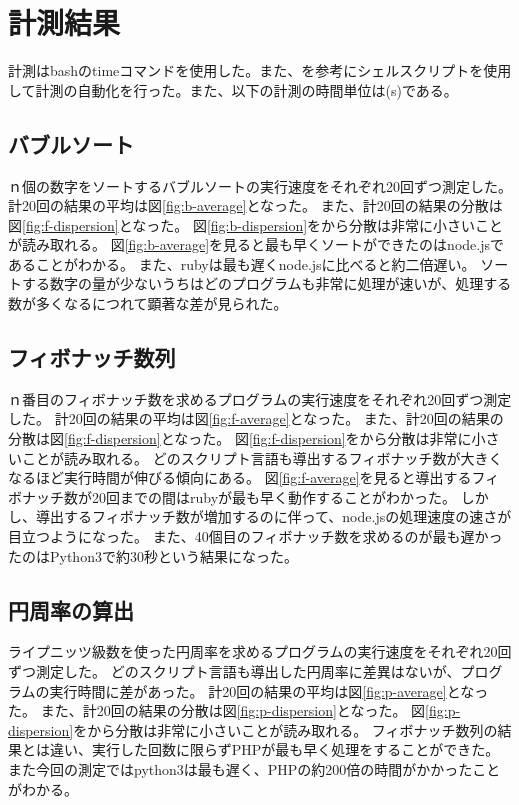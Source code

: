 \chapter{計測結果}
\label{cha:result}
計測はbashのtimeコマンドを使用した。また、\cite{bash}を参考にシェルスクリプトを使用して計測の自動化を行った。また、以下の計測の時間単位は(s)である。
\section{バブルソート}
ｎ個の数字をソートするバブルソートの実行速度をそれぞれ20回ずつ測定した。
計20回の結果の平均は図\ref{fig:b-average}となった。
また、計20回の結果の分散は図\ref{fig:f-dispersion}となった。
図\ref{fig:b-dispersion}をから分散は非常に小さいことが読み取れる。
図\ref{fig:b-average}を見ると最も早くソートができたのはnode.jsであることがわかる。
また、rubyは最も遅くnode.jsに比べると約二倍遅い。
ソートする数字の量が少ないうちはどのプログラムも非常に処理が速いが、処理する数が多くなるにつれて顕著な差が見られた。

\section{フィボナッチ数列}
ｎ番目のフィボナッチ数を求めるプログラムの実行速度をそれぞれ20回ずつ測定した。
計20回の結果の平均は図\ref{fig:f-average}となった。
また、計20回の結果の分散は図\ref{fig:f-dispersion}となった。
図\ref{fig:f-dispersion}をから分散は非常に小さいことが読み取れる。
どのスクリプト言語も導出するフィボナッチ数が大きくなるほど実行時間が伸びる傾向にある。
図\ref{fig:f-average}を見ると導出するフィボナッチ数が20回までの間はrubyが最も早く動作することがわかった。
しかし、導出するフィボナッチ数が増加するのに伴って、node.jsの処理速度の速さが目立つようになった。
また、40個目のフィボナッチ数を求めるのが最も遅かったのはPython3で約30秒という結果になった。

\clearpage
\section{円周率の算出}
ライプニッツ級数を使った円周率を求めるプログラムの実行速度をそれぞれ20回ずつ測定した。
どのスクリプト言語も導出した円周率に差異はないが、プログラムの実行時間に差があった。
計20回の結果の平均は図\ref{fig:p-average}となった。
また、計20回の結果の分散は図\ref{fig:p-dispersion}となった。
図\ref{fig:p-dispersion}をから分散は非常に小さいことが読み取れる。
フィボナッチ数列の結果とは違い、実行した回数に限らずPHPが最も早く処理をすることができた。
また今回の測定ではpython3は最も遅く、PHPの約200倍の時間がかかったことがわかる。

